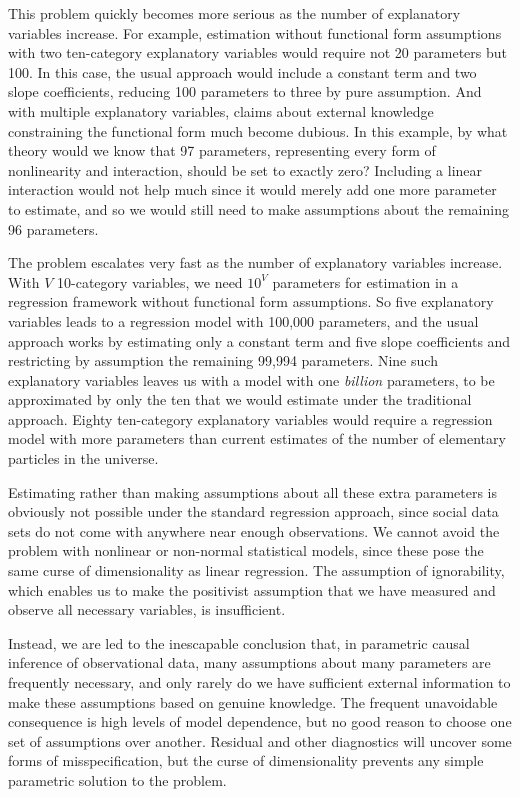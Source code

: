 \documentclass[11pt,titlepage]{article}
\begin{document}
This problem quickly becomes more serious as the number of explanatory
variables increase.  For example, estimation without functional form
assumptions with two ten-category explanatory variables would require
not 20 parameters but 100.  In this case, the usual approach would
include a constant term and two slope coefficients, reducing 100
parameters to three by pure assumption.  And with multiple explanatory
variables, claims about external knowledge constraining the functional
form much become dubious.  In this example, by what theory would we
know that 97 parameters, representing every form of nonlinearity and
interaction, should be set to exactly zero?  Including a linear
interaction would not help much since it would merely add one more
parameter to estimate, and so we would still need to make assumptions
about the remaining 96 parameters.

The problem escalates very fast as the number of explanatory variables
increase.  With $V$ 10-category variables, we need $10^V$ parameters
for estimation in a regression framework without functional form
assumptions.  So five explanatory variables leads to a regression
model with 100,000 parameters, and the usual approach works by
estimating only a constant term and five slope coefficients and
restricting by assumption the remaining 99,994 parameters.  Nine such
explanatory variables leaves us with a model with one \emph{billion}
parameters, to be approximated by only the ten that we would estimate
under the traditional approach.  Eighty ten-category explanatory
variables would require a regression model with more parameters than
current estimates of the number of elementary particles in the
universe.

Estimating rather than making assumptions about all these extra
parameters is obviously not possible under the standard regression
approach, since social data sets do not come with anywhere near enough
observations.  We cannot avoid the problem with nonlinear or
non-normal statistical models, since these pose the same curse of
dimensionality as linear regression.  The assumption of ignorability,
which enables us to make the positivist assumption that we have
measured and observe all necessary variables, is insufficient.

Instead, we are led to the inescapable conclusion that, in parametric
causal inference of observational data, many assumptions about many
parameters are frequently necessary, and only rarely do we have
sufficient external information to make these assumptions based on
genuine knowledge.  The frequent unavoidable consequence is high
levels of model dependence, but no good reason to choose one set of
assumptions over another.  Residual and other diagnostics will uncover
some forms of misspecification, but the curse of dimensionality
prevents any simple parametric solution to the problem.
\end{document}
